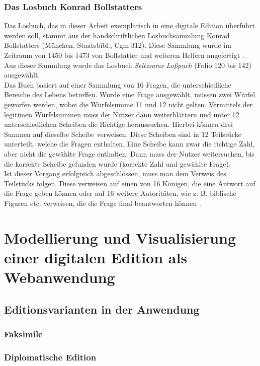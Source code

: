 \documentclass[12pt,a4paper]{article}
\begin{document}
		\subsubsection{Das Losbuch Konrad Bollstatters}
		Das Losbuch, das in dieser Arbeit exemplarisch in eine digitale Edition überführt werden soll, stammt aus der handschriftlichen Losbuchsammlung Konrad Bollstatters (München, Staatsbibl., Cgm 312).  
		Diese Sammlung wurde im Zeitraum von 1450 bis 1473 von Bollstatter und weiteren Helfern angefertigt \parencite[S.~239]{heiles}. Aus dieser Sammlung wurde das Losbuch \textit{Seltzsams Loßpuch} (Folio 120 bis 142) 
		ausgewählt.\\
		Das Buch basiert auf einer Sammlung von 16 Fragen, die unterschiedliche Bereiche des Lebens betreffen. Wurde eine Frage ausgewählt, müssen zwei Würfel geworfen werden, wobei die Würfelsumme 11 und 12 nicht gelten. 
		Vermittels der legitimen Würfelsummen muss der Nutzer dann weiterblättern und unter 12 unterschiedlichen Scheiben die Richtige heraussuchen. Hierbei können drei Summen auf dieselbe Scheibe verweisen. 
		Diese Scheiben sind in 12 Teilstücke unterteilt, welche die Fragen enthalten. Eine Scheibe kann zwar die richtige Zahl, aber nicht die gewählte Frage enthalten. Dann muss der Nutzer weitersuchen, 
		bis die korrekte Scheibe gefunden wurde (korrekte Zahl und gewählte Frage).\\
		Ist dieser Vorgang erfolgreich abgeschlossen, muss man dem Verweis des Teilstücks folgen. Diese verweisen auf einen von 16 Königen, die eine Antwort auf die Frage geben können oder auf 16 weitere 
		Autoritäten, wie z. B. biblische Figuren etc. verweisen, die die Frage final beantworten können \parencite[S.~4]{cugliana}.


\section{Modellierung und Visualisierung einer digitalen Edition als Webanwendung}
	\subsection{Editionsvarianten in der Anwendung}
		\subsubsection{Faksimile}
		\subsubsection{Diplomatische Edition}
\end{document}
